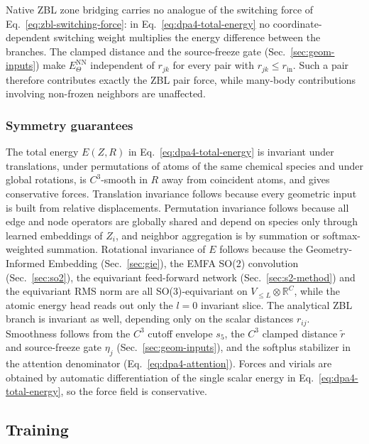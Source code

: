 Native ZBL zone bridging carries no analogue of the switching force of Eq.~\eqref{eq:zbl-switching-force}: in Eq.~\eqref{eq:dpa4-total-energy} no coordinate-dependent switching weight multiplies the energy difference between the branches.
The clamped distance and the source-freeze gate (Sec.~\ref{sec:geom-inputs}) make $E_{\Theta}^{\mathrm{NN}}$ independent of $r_{jk}$ for every pair with $r_{jk}\le r_{\mathrm{in}}$.
Such a pair therefore contributes exactly the ZBL pair force, while many-body contributions involving non-frozen neighbors are unaffected.

\subsubsection{Symmetry guarantees}
\label{sec:symmetry}

The total energy $E(Z,R)$ in Eq.~\eqref{eq:dpa4-total-energy} is invariant under translations, under permutations of atoms of the same chemical species and under global rotations, is $C^3$-smooth in $R$ away from coincident atoms, and gives conservative forces.
Translation invariance follows because every geometric input is built from relative displacements.
Permutation invariance follows because all edge and node operators are globally shared and depend on species only through learned embeddings of $Z_i$, and neighbor aggregation is by summation or softmax-weighted summation.
Rotational invariance of $E$ follows because the Geometry-Informed Embedding (Sec.~\ref{sec:gie}), the EMFA SO(2) convolution (Sec.~\ref{sec:so2}), the equivariant feed-forward network (Sec.~\ref{sec:s2-method}) and the equivariant RMS norm are all SO(3)-equivariant on $V_{\leq L}\otimes\mathbb{R}^{C}$, while the atomic energy head reads out only the $l=0$ invariant slice.
The analytical ZBL branch is invariant as well, depending only on the scalar distances $r_{ij}$.
Smoothness follows from the $C^3$ cutoff envelope $s_5$, the $C^3$ clamped distance $\widetilde{r}$ and source-freeze gate $\eta_j$ (Sec.~\ref{sec:geom-inputs}), and the softplus stabilizer in the attention denominator (Eq.~\eqref{eq:dpa4-attention}).
Forces and virials are obtained by automatic differentiation of the single scalar energy in Eq.~\eqref{eq:dpa4-total-energy}, so the force field is conservative.

\subsection{Training}

